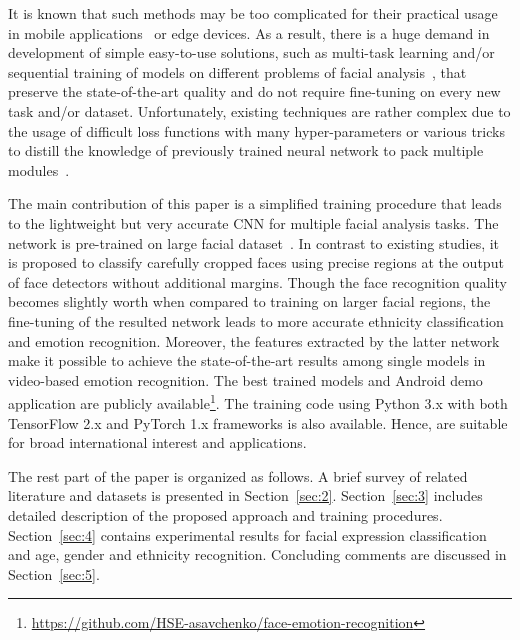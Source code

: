 \documentclass[runningheads]{llncs}
\begin{document}
It is known that such methods may be too complicated for their practical usage in mobile applications~\cite{demochkina2021mobileemotiface} or edge devices. As a result, there is a huge demand in development of simple easy-to-use solutions, such as multi-task learning and/or sequential training of models on different problems of facial analysis~\cite{wang2021multi,savchenko2019peerj}, that preserve the state-of-the-art quality and do not require fine-tuning on every new task and/or dataset. Unfortunately, existing techniques are rather complex due to the usage of difficult loss functions with many hyper-parameters or various tricks to distill the knowledge of previously trained neural network to pack multiple modules~\cite{hung2019increasingly}. 

The main contribution of this paper is a simplified training procedure that leads to the lightweight but very accurate CNN for multiple facial analysis tasks. The network is pre-trained on large facial dataset~\cite{cao2018vggface2}. In contrast to existing studies, it is proposed to classify carefully cropped faces using precise regions at the output of face detectors without additional margins. Though the face recognition quality becomes slightly worth when compared to training on larger facial regions, the fine-tuning of the resulted network leads to more accurate ethnicity classification and emotion recognition. Moreover, the features extracted by the latter network make it possible to achieve the state-of-the-art results among single models in video-based emotion recognition. The best trained models and Android demo application are publicly available\footnote{\url{https://github.com/HSE-asavchenko/face-emotion-recognition}}. The training code using Python 3.x with both TensorFlow 2.x and PyTorch 1.x frameworks is also available. Hence, are suitable for broad international interest and applications.

The rest part of the paper is organized as follows. A brief survey of related literature and datasets is presented in Section~\ref{sec:2}. Section~\ref{sec:3} includes detailed description of the proposed approach and training procedures. Section~\ref{sec:4} contains experimental results for facial expression classification and age, gender and ethnicity recognition. Concluding comments are discussed in Section~\ref{sec:5}.
\end{document}

